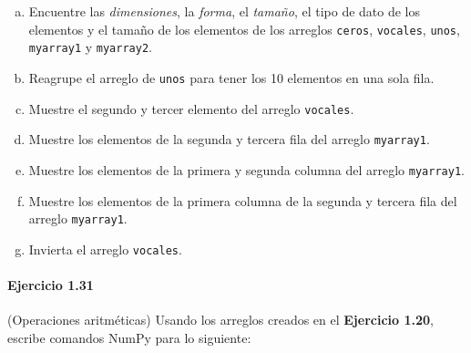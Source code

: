 \begin{enumerate}[(a)]
	\item

	      Encuentre las \emph{dimensiones}, la \emph{forma}, el
	      \emph{tamaño}, el tipo de dato de los elementos y el tamaño
	      de los elementos de los arreglos \texttt{ceros},
	      \texttt{vocales}, \texttt{unos},
	      \texttt{myarray1} y
	      \texttt{myarray2}.

	\item

	      Reagrupe el arreglo de \texttt{unos} para tener
	      los 10 elementos en una sola fila.

	\item

	      Muestre el segundo y tercer elemento del arreglo
	      \texttt{vocales}.

	\item

	      Muestre los elementos de la segunda y tercera fila del
	      arreglo \texttt{myarray1}.

	\item

	      Muestre los elementos de la primera y segunda columna del
	      arreglo \texttt{myarray1}.

	\item

	      Muestre los elementos de la primera columna de la segunda y
	      tercera fila del arreglo \texttt{myarray1}.

	\item

	      Invierta el arreglo \texttt{vocales}.
\end{enumerate}

\paragraph{\color{DarkBlue}Ejercicio 1.31}
(Operaciones aritméticas)
Usando los arreglos creados en el \textbf{Ejercicio 1.20},
escribe comandos NumPy para lo siguiente:

